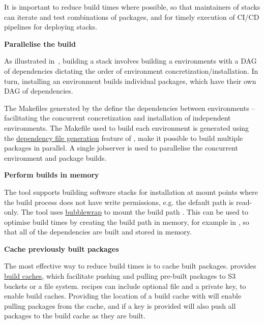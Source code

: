It is important to reduce build times where possible, so that maintainers of stacks can iterate and test combinations of packages, and for timely execution of CI/CD pipelines for deploying stacks.

\noindent\textbf{Parallelise the build}

As illustrated in~, building a \spack stack involves building a \spack environments with a DAG of dependencies dictating the order of environment concretization/installation.
In turn, installing an environment builds individual packages, which have their own DAG of dependencies.

The Makefiles generated by the \stackinator define the dependencies between environments -- facilitating the concurrent concretization and installation of independent environments. The Makefile used to build each environment is generated using the
\href{https://spack.readthedocs.io/en/latest/environments.html#generating-depfiles-from-environments}{dependency file generation} feature of \spack, make it possible to build multiple packages in parallel.
A single jobserver is used to parallelise the concurrent environment and package builds.

\noindent\textbf{Perform builds in memory}

The \stackinator tool supports building software stacks for installation at mount points where the build process does not have write permissions, e.g. the default  path is read-only.
The tool uses \href{https://github.com/containers/bubblewrap}{bubblewrap} to mount the build path .
This can be used to optimise build times by creating the build path in memory, for example in , so that all of the dependencies are built and stored in memory.

\noindent\textbf{Cache previously built packages}

The most effective way to reduce build times is to cache built packages.
\spack provides \href{https://spack.readthedocs.io/en/latest/binary_caches.html}{build caches}, which facilitate pushing and pulling pre-built packages to S3 buckets or a file system.
\stackinator recipes can include optional  file and a private key, to enable build caches.
Providing the location of a build cache with  will enable pulling packages from the cache, and if a key is provided \stackinator will also push all packages to the build cache as they are built.
